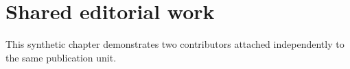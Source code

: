 \chapter{Shared editorial work}
This synthetic chapter demonstrates two contributors attached independently to the same publication unit.
